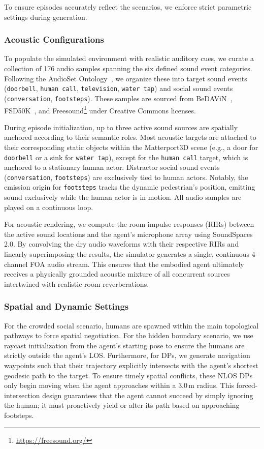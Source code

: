To ensure episodes accurately reflect the scenarios, we enforce strict parametric settings during generation.

\subsubsection{Acoustic Configurations}
To populate the simulated environment with realistic auditory cues, we curate a collection of 176 audio samples spanning the six defined sound event categories. Following the AudioSet Ontology~\cite{AudioSetOntology2017}, we organize these into target sound events (\texttt{doorbell}, \texttt{human call}, \texttt{television}, \texttt{water tap}) and social sound events (\texttt{conversation}, \texttt{footsteps}). These samples are sourced from BeDAViN~\cite{AudiovisualNavigationNoisy2025}, FSD50K~\cite{FSD50KOpenDataset2022}, and Freesound\footnote{\url{https://freesound.org/}} under Creative Commons licenses.

During episode initialization, up to three active sound sources are spatially anchored according to their semantic roles. Most acoustic targets are attached to their corresponding static objects within the Matterport3D scene (e.g., a door for \texttt{doorbell} or a sink for \texttt{water tap}), except for the \texttt{human call} target, which is anchored to a stationary human actor. Distractor social sound events (\texttt{conversation}, \texttt{footsteps}) are exclusively tied to human actors. Notably, the emission origin for \texttt{footsteps} tracks the dynamic pedestrian's position, emitting sound exclusively while the human actor is in motion. All audio samples are played on a continuous loop.

For acoustic rendering, we compute the room impulse responses (RIRs) between the active sound locations and the agent's microphone array using SoundSpaces 2.0. By convolving the dry audio waveforms with their respective RIRs and linearly superimposing the results, the simulator generates a single, continuous 4-channel FOA audio stream. This ensures that the embodied agent ultimately receives a physically grounded acoustic mixture of all concurrent sources intertwined with realistic room reverberations.

\subsubsection{Spatial and Dynamic Settings}
For the crowded social scenario, humans are spawned within the main topological pathways to force spatial negotiation. For the hidden boundary scenario, we use raycast initialization from the agent's starting pose to ensure the humans are strictly outside the agent's LOS. Furthermore, for DPs, we generate navigation waypoints such that their trajectory explicitly intersects with the agent's shortest geodesic path to the target. To ensure timely spatial conflicts, these NLOS DPs only begin moving when the agent approaches within a $3.0\,\mathrm{m}$ radius. This forced-intersection design guarantees that the agent cannot succeed by simply ignoring the human; it must proactively yield or alter its path based on approaching footsteps.

